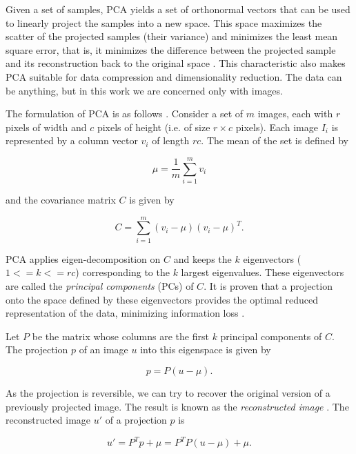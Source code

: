 \documentclass[10pt, conference, compsocconf]{IEEEtran}
\begin{document}
Given a set of samples, PCA yields a set of orthonormal vectors that can be used to linearly project the samples into a new space. This space maximizes the scatter of the projected samples (their variance) and minimizes the least mean square error, that is, it minimizes the difference between the projected sample and its reconstruction back to the original space \cite{shlens09}. This characteristic also makes PCA suitable for data compression and dimensionality reduction. The data can be anything, but in this work we are concerned only with images.

The formulation of PCA is as follows \cite{borja09}. Consider a set of $m$ images, each with $r$ pixels of width and $c$ pixels of height (i.e. of size $r \times c$ pixels). Each image $I_i$ is represented by a column vector $v_i$ of length $rc$. The mean of the set is defined by

\begin{equation}
  \mu = \frac{1}{m} \sum_{i=1}^m{v_i}
\end{equation}

\noindent and the covariance matrix $C$ is given by

\begin{equation}
  C = \sum_{i=1}^m{(v_i - \mu)(v_i - \mu)^T}.
\end{equation}

PCA applies eigen-decomposition on $C$ and keeps the $k$ eigenvectors ($1 <= k <= rc$) corresponding to the $k$ largest eigenvalues. These eigenvectors are called the \emph{principal components} (PCs) of $C$. It is proven that a projection onto the space defined by these eigenvectors provides the optimal reduced representation of the data, minimizing information loss \cite{shlens09}.

Let $P$ be the matrix whose columns are the first $k$ principal components of $C$. The projection $p$ of an image $u$ into this eigenspace is given by

\begin{equation}
  p = P (u - \mu).
\end{equation}

\noindent As the projection is reversible, we can try to recover the original version of a previously projected image. The result is known as the \emph{reconstructed image} \cite{borja09}. The reconstructed image $u'$ of a projection $p$ is

\begin{equation}
  u' = P^Tp + \mu = P^T P(u - \mu) + \mu.
\end{equation}
\end{document}
